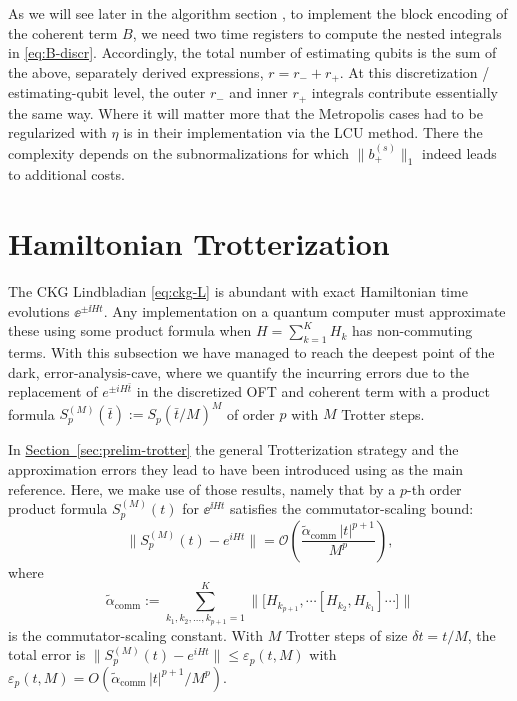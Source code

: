 As we will see later in the algorithm section , to implement the block encoding of the coherent term $B$, we need two time registers to compute the nested integrals in \eqref{eq:B-discr}. Accordingly, the total number of estimating qubits is the sum of the above, separately derived expressions, $r = r_- + r_+$. At this discretization / estimating-qubit level, the outer $r_-$ and inner $r_+$ integrals contribute essentially the same way. Where it will matter more that the Metropolis cases had to be regularized with $\eta$ is in their implementation via the LCU method. There the complexity depends on the subnormalizations for which $\|b^{(s)}_+\|_1$ indeed leads to additional costs. 


\smallskip
\label{sec:ckg-trotter}
\section{Hamiltonian Trotterization}
The CKG Lindbladian \eqref{eq:ckg-L} is abundant with exact Hamiltonian time evolutions $\ee^{\pm \ii H t}$. Any implementation on a quantum computer must approximate these using some product formula when $H = \sum_{k = 1}^K H_k$ has non-commuting terms. With this subsection we have managed to reach the deepest point of the dark, error-analysis-cave, where we quantify the incurring errors due to the replacement of $e^{\pm iH\bar{t}}$ in the discretized OFT and coherent term with a product formula $S_p^{(M)}(\bar{t}) := S_p(\bar{t}/M)^M$ of order $p$ with $M$ Trotter steps. 

In \hyperref[sec:prelim-trotter]{Section~\ref*{sec:prelim-trotter}} the general Trotterization strategy and the approximation errors they lead to have been introduced using \cite{childs2021theory} as the main reference. Here, we make use of those results, namely that by \cite[Theorem 6]{childs2021theory} a $p$-th order product formula $S_p^{(M)}(t)$ for $\ee^{\ii Ht}$ satisfies the commutator-scaling bound:
\begin{equation} \label{eq:childs-trotter-bound}
    \bigl\|S_p^{(M)}(t) - e^{iHt}\bigr\|
    = \mathcal{O}\!\left(\frac{\tilde{\alpha}_{\mathrm{comm}}\, |t|^{p+1}}{M^p}\right),
\end{equation}
where
$$
\tilde{\alpha}_{\mathrm{comm}}
:= \sum_{k_1, k_2, \ldots, k_{p+1} = 1}^{K}
\bigl\|\bigl[H_{k_{p+1}}, \cdots [H_{k_2}, H_{k_1}]\cdots\bigr]\bigr\|
$$
is the commutator-scaling constant. With $M$ Trotter steps of size $\delta t = t / M$, the total error is $\|S_p^{(M)}(t) - e^{iHt}\| \leq \varepsilon_p(t, M)$ with $\varepsilon_p(t, M) = O(\tilde{\alpha}_{\mathrm{comm}}\, |t|^{p+1}/M^p)$. 

